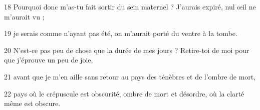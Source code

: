 18 Pourquoi donc m’as-tu fait sortir du sein maternel ? J’aurais expiré, nul œil ne m’aurait vu ;

19 je serais comme n’ayant pas été, on m’aurait porté du ventre à la tombe.

20 N’est-ce pas peu de chose que la durée de mes jours ? Retire-toi de moi pour que j’éprouve un peu de joie,

21 avant que je m’en aille sans retour au pays des ténèbres et de l’ombre de mort,

22 pays où le crépuscule est obscurité, ombre de mort et désordre, où la clarté même est obscure.